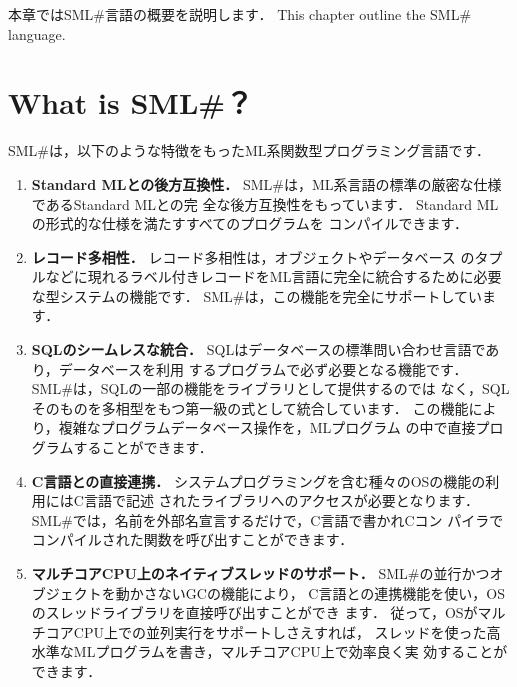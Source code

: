 \documentclass{jbook}
\newcommand{\txt}[2]{#2}
\newcommand{\smlsharp}{SML\#}
\begin{document}
\ifx\jp%
本章では\smlsharp{}言語の概要を説明します．
\else%
This chapter outline the \smlsharp{} language.
\fi%

\section{\txt{\smlsharp{}とは？}{What is \smlsharp{}？}}
\label{sec:whatIsSmlsharp}

\ifx\jp%
\smlsharp{}は，以下のような特徴をもったML系関数型プログラミング言語です．
\begin{enumerate}
\item {\bf Standard MLとの後方互換性．}
	\smlsharp{}は，ML系言語の標準の厳密な仕様であるStandard MLとの完
全な後方互換性をもっています．
	Standard MLの形式的な仕様\cite{sml}を満たすすべてのプログラムを
コンパイルできます．

\item {\bf レコード多相性．}
	レコード多相性\cite{ohor95toplas}は，オブジェクトやデータベース
のタプルなどに現れるラベル付きレコードをML言語に完全に統合するために必要
な型システムの機能です．
	\smlsharp{}は，この機能を完全にサポートしています．

\item {\bf SQLのシームレスな統合．}
	SQLはデータベースの標準問い合わせ言語であり，データベースを利用
するプログラムで必ず必要となる機能です．
	\smlsharp{}は，SQLの一部の機能をライブラリとして提供するのでは
なく，SQLそのものを多相型をもつ第一級の式として統合しています．
	この機能により，複雑なプログラムデータベース操作を，MLプログラム
の中で直接プログラムすることができます．
	
\item {\bf C言語との直接連携．}
	システムプログラミングを含む種々のOSの機能の利用にはC言語で記述
されたライブラリへのアクセスが必要となります．
	\smlsharp{}では，名前を外部名宣言するだけで，C言語で書かれCコン
パイラでコンパイルされた関数を呼び出すことができます．

\item {\bf マルチコアCPU上のネイティブスレッドのサポート．}
	\smlsharp{}の並行かつオブジェクトを動かさないGCの機能により，
C言語との連携機能を使い，OSのスレッドライブラリを直接呼び出すことができ
ます．
	従って，OSがマルチコアCPU上での並列実行をサポートしさえすれば，
スレッドを使った高水準なMLプログラムを書き，マルチコアCPU上で効率良く実
効することができます．


\end{enumerate}
\end{document}
